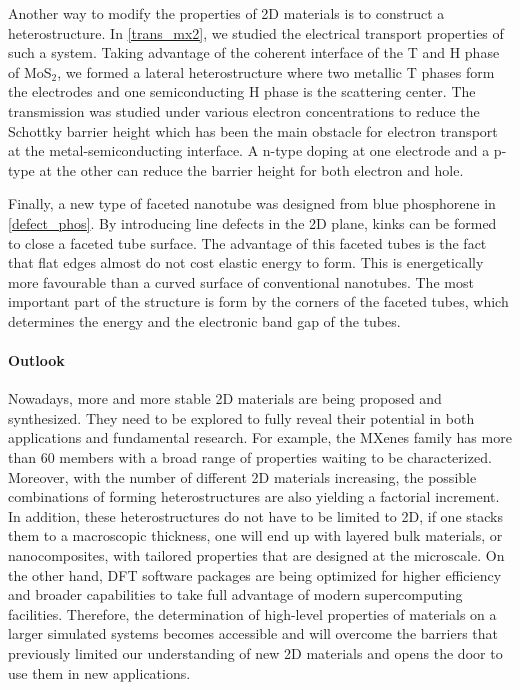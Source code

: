 Another way to modify the properties of 2D materials is to construct a heterostructure. In \autoref{trans_mx2}, we studied the electrical transport properties of such a system. Taking advantage of the coherent interface of the T and H phase of MoS$_2$, we formed a lateral heterostructure where two metallic T phases form the electrodes and one semiconducting H phase is the scattering center. The transmission was studied under various electron concentrations to reduce the Schottky barrier height which has been the main obstacle for electron transport at the metal-semiconducting interface. A n-type doping at one electrode and a p-type at the other can reduce the barrier height for both electron and hole. 

Finally, a new type of faceted nanotube was designed from blue phosphorene in \autoref{defect_phos}. By introducing line defects in the 2D plane, kinks can be formed to close a faceted tube surface. The advantage of this faceted tubes is the fact that flat edges almost do not cost elastic energy to form. This is energetically more favourable than a curved surface of conventional nanotubes. The most important part of the structure is form by the corners of the faceted tubes, which determines the energy and the electronic band gap of the tubes.

\paragraph{Outlook} Nowadays, more and more stable 2D materials are being proposed and synthesized. They need to be explored to fully reveal their potential in both applications and fundamental research. For example, the MXenes family has more than 60 members with a broad range of properties waiting to be characterized. Moreover, with the number of different 2D materials increasing, the possible combinations of forming heterostructures are also yielding a factorial increment. In addition, these heterostructures do not have to be limited to 2D, if one stacks them to a macroscopic thickness, one will end up with layered bulk materials, or nanocomposites, with tailored properties that are designed at the microscale. On the other hand, DFT software packages are being optimized for higher efficiency and broader capabilities to take full advantage of modern supercomputing facilities. Therefore, the determination of high-level properties of materials on a larger simulated systems becomes accessible and will overcome the barriers that previously limited our understanding of new 2D materials and opens the door to use them in new applications.